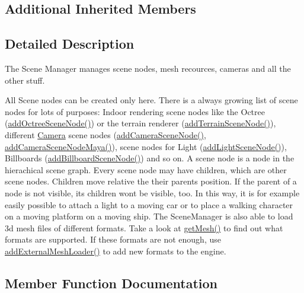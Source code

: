 \subsection*{Additional Inherited Members}


\subsection{Detailed Description}
The Scene Manager manages scene nodes, mesh recources, cameras and all the other stuff. 

All Scene nodes can be created only here. There is a always growing list of scene nodes for lots of purposes\+: Indoor rendering scene nodes like the Octree (\hyperlink{classirr_1_1scene_1_1ISceneManager_a503339385ca2b33d7e8035a61c4eca84}{add\+Octree\+Scene\+Node()}) or the terrain renderer (\hyperlink{classirr_1_1scene_1_1ISceneManager_a2188fb0443c7e0b6b69a673ca1d9ca5c}{add\+Terrain\+Scene\+Node()}), different \hyperlink{classCamera}{Camera} scene nodes (\hyperlink{classirr_1_1scene_1_1ISceneManager_afc3733849319078d5d22d94f58c7d1f2}{add\+Camera\+Scene\+Node()}, \hyperlink{classirr_1_1scene_1_1ISceneManager_a18e81a59e02231567ac938ea287fe523}{add\+Camera\+Scene\+Node\+Maya()}), scene nodes for Light (\hyperlink{classirr_1_1scene_1_1ISceneManager_a2e6442f8c95a544c355bd137ccdb7095}{add\+Light\+Scene\+Node()}), Billboards (\hyperlink{classirr_1_1scene_1_1ISceneManager_a00266a58b97e827acd9e105806a99c3a}{add\+Billboard\+Scene\+Node()}) and so on. A scene node is a node in the hierachical scene graph. Every scene node may have children, which are other scene nodes. Children move relative the their parents position. If the parent of a node is not visible, its children won\textquotesingle{}t be visible, too. In this way, it is for example easily possible to attach a light to a moving car or to place a walking character on a moving platform on a moving ship. The Scene\+Manager is also able to load 3d mesh files of different formats. Take a look at \hyperlink{classirr_1_1scene_1_1ISceneManager_a63894c3f3d46cfc385116f1705935e03}{get\+Mesh()} to find out what formats are supported. If these formats are not enough, use \hyperlink{classirr_1_1scene_1_1ISceneManager_a808972cc001db86c0576c38b3b3fbbf7}{add\+External\+Mesh\+Loader()} to add new formats to the engine. 

\subsection{Member Function Documentation}
\mbox{\label{classirr_1_1scene_1_1ISceneManager_a8e2e0cd3a27e85b4116855dd2f3365b8}} 
